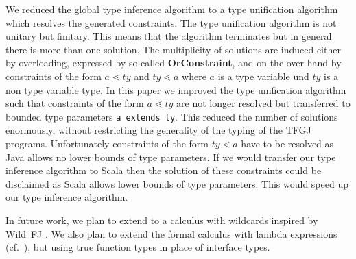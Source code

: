We reduced the global type inference algorithm to a type unification algorithm
which resolves the generated constraints. The type unification algorithm is not
unitary but finitary. This means that the algorithm terminates but in general
there is more than one solution. The multiplicity of solutions are induced
either by overloading, expressed by so-called \textbf{OrConstraint}, and on the over hand by constraints of the form $a
\lessdot ty$ and $ty \lessdot a$ where $a$ is a type variable und $ty$ is a non
type variable type. In this paper we improved the type unification algorithm
such that constraints of the form $a \lessdot ty$ are not longer resolved but
transferred to bounded type parameters \texttt{a extends ty}. This reduced the
number of solutions enormously, without restricting the generality of the typing
of the TFGJ programs. Unfortunately constraints of the form $ty \lessdot a$ have
to be resolved as Java allows no lower bounds of type parameters. If we would
transfer our type inference algorithm to Scala then the solution of these
constraints could be disclaimed as Scala allows lower bounds of type
parameters. This would speed up our type inference algorithm.
\fi

In future work, we plan to extend \FGJGT to a calculus with wildcards
inspired by Wild~FJ \cite{TEP05}. 
We also plan to extend the formal calculus with lambda expressions
(cf.\ \cite{BBDGV18}), but using true function types in place of
interface types.


